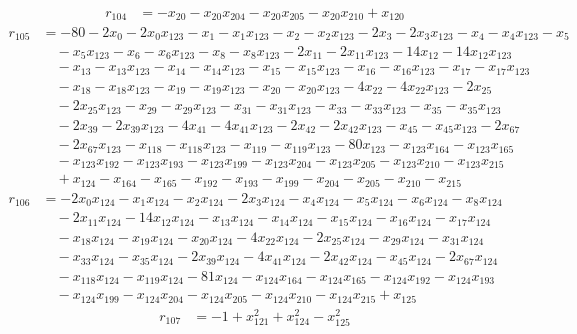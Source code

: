 \begin{align*}
r_{104}&=
-x_{20}-x_{20}x_{204}-x_{20}x_{205}-x_{20}x_{210}+x_{120}
\end{align*}
\begin{align*}
r_{105}&=
-80-2x_{0}-2x_{0}x_{123}-x_{1}-x_{1}x_{123}-x_{2}-x_{2}x_{123}-2x_{3}-2x_{3}x_{123}-x_{4}-x_{4}x_{123}-x_{5} \\
&\quad -x_{5}x_{123}-x_{6}-x_{6}x_{123}-x_{8}-x_{8}x_{123}-2x_{11}-2x_{11}x_{123}-14x_{12}-14x_{12}x_{123} \\
&\quad -x_{13}-x_{13}x_{123}-x_{14}-x_{14}x_{123}-x_{15}-x_{15}x_{123}-x_{16}-x_{16}x_{123}-x_{17}-x_{17}x_{123} \\
&\quad -x_{18}-x_{18}x_{123}-x_{19}-x_{19}x_{123}-x_{20}-x_{20}x_{123}-4x_{22}-4x_{22}x_{123}-2x_{25} \\
&\quad -2x_{25}x_{123}-x_{29}-x_{29}x_{123}-x_{31}-x_{31}x_{123}-x_{33}-x_{33}x_{123}-x_{35}-x_{35}x_{123} \\
&\quad -2x_{39}-2x_{39}x_{123}-4x_{41}-4x_{41}x_{123}-2x_{42}-2x_{42}x_{123}-x_{45}-x_{45}x_{123}-2x_{67} \\
&\quad -2x_{67}x_{123}-x_{118}-x_{118}x_{123}-x_{119}-x_{119}x_{123}-80x_{123}-x_{123}x_{164}-x_{123}x_{165} \\
&\quad -x_{123}x_{192}-x_{123}x_{193}-x_{123}x_{199}-x_{123}x_{204}-x_{123}x_{205}-x_{123}x_{210}-x_{123}x_{215} \\
&\quad +x_{124}-x_{164}-x_{165}-x_{192}-x_{193}-x_{199}-x_{204}-x_{205}-x_{210}-x_{215}
\end{align*}
\begin{align*}
r_{106}&=
-2x_{0}x_{124}-x_{1}x_{124}-x_{2}x_{124}-2x_{3}x_{124}-x_{4}x_{124}-x_{5}x_{124}-x_{6}x_{124}-x_{8}x_{124} \\
&\quad -2x_{11}x_{124}-14x_{12}x_{124}-x_{13}x_{124}-x_{14}x_{124}-x_{15}x_{124}-x_{16}x_{124}-x_{17}x_{124} \\
&\quad -x_{18}x_{124}-x_{19}x_{124}-x_{20}x_{124}-4x_{22}x_{124}-2x_{25}x_{124}-x_{29}x_{124}-x_{31}x_{124} \\
&\quad -x_{33}x_{124}-x_{35}x_{124}-2x_{39}x_{124}-4x_{41}x_{124}-2x_{42}x_{124}-x_{45}x_{124}-2x_{67}x_{124} \\
&\quad -x_{118}x_{124}-x_{119}x_{124}-81x_{124}-x_{124}x_{164}-x_{124}x_{165}-x_{124}x_{192}-x_{124}x_{193} \\
&\quad -x_{124}x_{199}-x_{124}x_{204}-x_{124}x_{205}-x_{124}x_{210}-x_{124}x_{215}+x_{125}
\end{align*}
\begin{align*}
r_{107}&=
-1+x_{121}^{2}+x_{124}^{2}-x_{125}^{2}
\end{align*}
